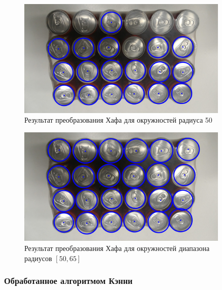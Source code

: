\begin{figure}[H]
    \centering
    \includegraphics[width=0.9\textwidth]{../outputs/image6_ordinary_r50.png}
    \caption{Результат преобразования Хафа для окружностей радиуса 50}
\end{figure}


\begin{figure}[H]
    \centering
    \includegraphics[width=0.9\textwidth]{../outputs/image6_ordinary_r5065.png}
    \caption{Результат преобразования Хафа для окружностей диапазона радиусов $[50, 65]$}
\end{figure}

\subsubsection{Обработанное алгоритмом Кэнни}



